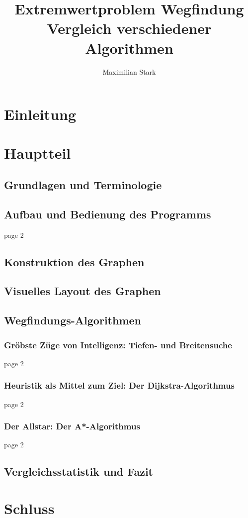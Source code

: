 \documentclass[12pt]{article}
\begin{document}
\title{Extremwertproblem Wegfindung \\  \large{\enspace Vergleich verschiedener Algorithmen}}

\author{Maximilian Stark}

\maketitle
\thispagestyle{empty}
\clearpage

\tableofcontents
\clearpage

\section{Einleitung}
\newpage

\section{Hauptteil}
\newpage

\subsection{Grundlagen und Terminologie}
\newpage

\subsection{Aufbau und Bedienung des Programms}
\newpage
page 2
\newpage

\subsection{Konstruktion des Graphen}
\newpage

\subsection{Visuelles Layout des Graphen}
\newpage

\subsection{Wegfindungs-Algorithmen}
\newpage

\subsubsection{Gröbste Züge von Intelligenz: Tiefen- und Breitensuche}
\newpage
page 2
\newpage

\subsubsection{Heuristik als Mittel zum Ziel: Der Dijkstra-Algorithmus}
\newpage
page 2
\newpage

\subsubsection{Der Allstar: Der A*-Algorithmus}
\newpage
page 2
\newpage

\subsection{Vergleichsstatistik und Fazit}
\newpage

\section{Schluss}
\end{document}
